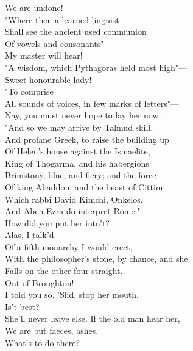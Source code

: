 \documentclass[a4paper,oneside]{memoir}
\begin{document}
\begin{drama*}
We are undone!\\
\dolspeaks {} "Where then a learned linguist\\
Shall see the ancient used communion\\
Of vowels and consonants"---\\
\facespeaks {} My master will hear!\\
\dolspeaks "A wisdom, which Pythagoras held most high"---\\
\mammonspeaks Sweet honourable lady!\\
\dolspeaks {} "To comprise\\
All sounds of voices, in few marks of letters"---\\
\facespeaks Nay, you must never hope to lay her now.\\
\dolspeaks "And so we may arrive by Talmud skill,\\
And profane Greek, to raise the building up\\
Of Helen's house against the Ismaelite,\\
King of Thogarma, and his habergions\\
Brimstony, blue, and fiery; and the force\\
Of king Abaddon, and the beast of Cittim:\\
Which rabbi David Kimchi, Onkelos,\\
And Aben Ezra do interpret Rome."\\
\facespeaks How did you put her into't?\\
\mammonspeaks {} Alas, I talk'd\\
Of a fifth monarchy I would erect,\\
With the philosopher's stone, by chance, and she\\
Falls on the other four straight.\\
\facespeaks {} Out of Broughton!\\
I told you so. 'Slid, stop her mouth.\\
\mammonspeaks {} Is't best?\\
\facespeaks She'll never leave else. If the old man hear her,\\
We are but faeces, ashes.\\
\subtlespeaks {} What's to do there?\\

\end{drama*}
\end{document}
